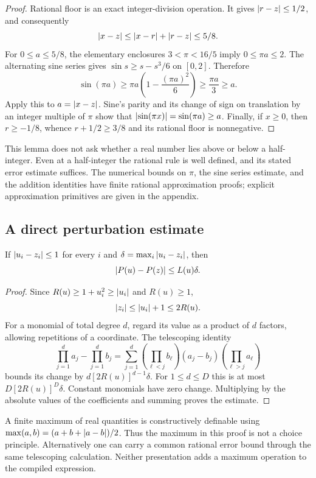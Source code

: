 \begin{proof}
Rational floor is an exact integer-division operation. It gives
$\left|r-z\right|\le1/2$, and consequently
\[
 \left|x-z\right|\le\left|x-r\right|+\left|r-z\right|\le5/8.
\]
For $0\le a\le5/8$, the elementary enclosures
$3<\pi<16/5$ imply $0\le\pi a\le2$. The alternating sine series gives
$\sin s\ge s-s^3/6$ on $[0,2]$. Therefore
\[
 \sin(\pi a)
 \ge\pi a\left(1-\frac{(\pi a)^2}{6}\right)
 \ge\frac{\pi a}{3}\ge a.
\]
Apply this to $a=\left|x-z\right|$. Sine's parity and its change of sign on
translation by an integer multiple of $\pi$ show that
$\left|\sin(\pi x)\right|=\sin(\pi a)\ge a$. Finally, if $x\ge0$, then
$r\ge-1/8$, whence $r+1/2\ge3/8$ and its rational floor is nonnegative.
\end{proof}

This lemma does not ask whether a real number lies above or below a
half-integer. Even at a half-integer the rational rule is well defined, and
its stated error estimate suffices. The numerical bounds on $\pi$, the sine
series estimate, and the addition identities have finite rational
approximation proofs; explicit approximation primitives are given in the
appendix.

\subsection{A direct perturbation estimate}

\begin{lemma}\label{lem:perturbation}
If $\left|u_i-z_i\right|\le1$ for every $i$ and
$\delta=\max_i\left|u_i-z_i\right|$, then
\[
 \left|P(u)-P(z)\right|\le L(u)\delta.
\]
\end{lemma}

\begin{proof}
Since $R(u)\ge1+u_i^2\ge\left|u_i\right|$ and $R(u)\ge1$,
\[
 \left|z_i\right|\le\left|u_i\right|+1\le2R(u).
\]
For a monomial of total degree $d$, regard its value as a product of $d$
factors, allowing repetitions of a coordinate. The telescoping identity
\[
 \prod_{j=1}^d a_j-\prod_{j=1}^d b_j
 =\sum_{j=1}^d
   \left(\prod_{\ell<j}b_\ell\right)
   (a_j-b_j)
   \left(\prod_{\ell>j}a_\ell\right)
\]
bounds its change by $d[2R(u)]^{d-1}\delta$. For $1\le d\le D$ this is at
most $D[2R(u)]^D\delta$. Constant monomials have zero change. Multiplying
by the absolute values of the coefficients and summing proves the estimate.
\end{proof}

A finite maximum of real quantities is constructively definable using
$\max(a,b)=(a+b+\left|a-b\right|)/2$. Thus the maximum in this proof is not a
choice principle. Alternatively one can carry a common rational error bound
through the same telescoping calculation. Neither presentation adds a
maximum operation to the compiled expression.


